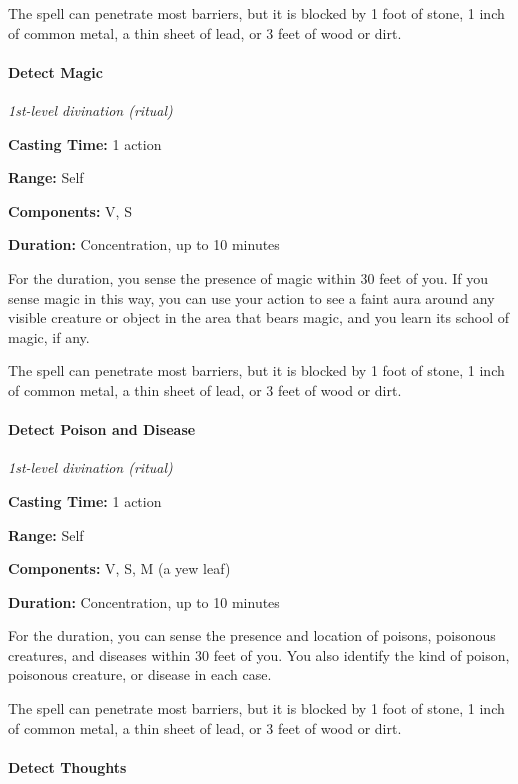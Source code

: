 \documentclass[
]{article}
\begin{document}
The spell can penetrate most barriers, but it is blocked by 1 foot of
stone, 1 inch of common metal, a thin sheet of lead, or 3 feet of wood
or dirt.

\hypertarget{detect-magic}{%
\paragraph{Detect Magic}\label{detect-magic}}

\emph{1st-level divination (ritual)}

\textbf{Casting Time:} 1 action

\textbf{Range:} Self

\textbf{Components:} V, S

\textbf{Duration:} Concentration, up to 10 minutes

For the duration, you sense the presence of magic within 30 feet of you.
If you sense magic in this way, you can use your action to see a faint
aura around any visible creature or object in the area that bears magic,
and you learn its school of magic, if any.

The spell can penetrate most barriers, but it is blocked by 1 foot of
stone, 1 inch of common metal, a thin sheet of lead, or 3 feet of wood
or dirt.

\hypertarget{detect-poison-and-disease}{%
\paragraph{Detect Poison and Disease}\label{detect-poison-and-disease}}

\emph{1st-level divination (ritual)}

\textbf{Casting Time:} 1 action

\textbf{Range:} Self

\textbf{Components:} V, S, M (a yew leaf)

\textbf{Duration:} Concentration, up to 10 minutes

For the duration, you can sense the presence and location of poisons,
poisonous creatures, and diseases within 30 feet of you. You also
identify the kind of poison, poisonous creature, or disease in each
case.

The spell can penetrate most barriers, but it is blocked by 1 foot of
stone, 1 inch of common metal, a thin sheet of lead, or 3 feet of wood
or dirt.

\hypertarget{detect-thoughts}{%
\paragraph{Detect Thoughts}\label{detect-thoughts}}
\end{document}
